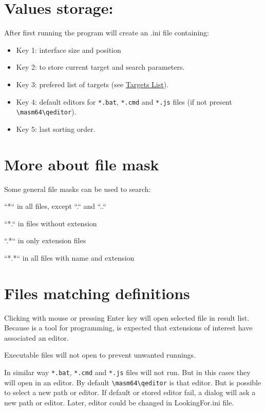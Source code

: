 \documentclass[11pt,a4paper,numbers=enddot]{scrartcl}
\begin{document}
\section{Values storage: }

	After first running the program will create an .ini file containing:
	
    \begin{itemize}
	\item Key 1: interface size and position    	
	\item Key 2: to store current target and search parameters.
	\item Key 3: prefered list of targets (see \hyperlink{targets}{Targets List}).
	\item Key 4: default editors for \verb$*.bat$, \verb$*.cmd$ and \verb$*.js$ files (if not present \verb$\masm64\qeditor$).
	\item Key 5: last sorting order.
    \end{itemize}

\section {More about file mask}

	Some general file masks can be used to search:
	
	\hspace{2cm}``*``  in all files, except ``.`` and ``..``
	
	\hspace{2cm}``*.`` in files without extension

	\hspace{2cm}``.*`` in only extension files 

	\hspace{2cm}``*.*`` in all files with name and extension
	
\section {Files matching definitions}
	
	Clicking with mouse or pressing Enter key will open selected file in result list. Because is a tool for programming, is expected that extensions of interest have associated an editor.
	
	Executable files will not open to prevent unwanted runnings. 
	
	In similar way \verb$*.bat$, \verb$*.cmd$ and \verb$*.js$ files will not run. But in this cases they will open in an editor. By default \verb$\masm64\qeditor$ is that editor. But is possible to select a new path or editor. If default or stored editor fail, a dialog will ask a new path or editor. Later, editor could be changed in LookingFor.ini file.
\end{document}

